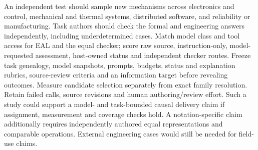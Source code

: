 \documentclass[preprint,12pt]{elsarticle}
\begin{document}
An independent test should sample new mechanisms across electronics and control, mechanical and thermal systems, distributed software, and reliability or manufacturing. Task authors should check the formal and engineering answers independently, including underdetermined cases. Match model class and tool access for EAL and the equal checker; score raw source, instruction-only, model-requested assessment, host-owned status and independent checker routes. Freeze task genealogy, model snapshots, prompts, budgets, status and explanation rubrics, source-review criteria and an information target before revealing outcomes. Measure candidate selection separately from exact family resolution. Retain failed calls, source revisions and human authoring/review effort. Such a study could support a model- and task-bounded causal delivery claim if assignment, measurement and coverage checks hold. A notation-specific claim additionally requires independently authored equal representations and comparable operations. External engineering cases would still be needed for field-use claims.
\end{document}
